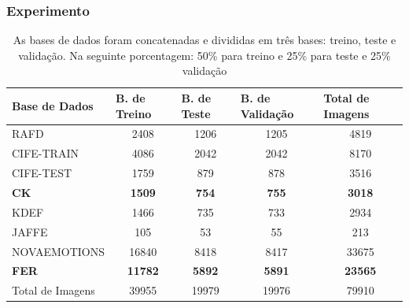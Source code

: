 \documentclass{beamer}
\begin{document}
\begin{frame}
\frametitle{Experimento}
\begin{table}
\tiny
\centering
\caption{As bases de dados foram concatenadas e divididas em três bases: treino, teste e validação. Na seguinte porcentagem: 50\% para treino e 25\% para teste e 25\% validação }
\label{table:basesdivisao}
\begin{tabular}{lcccc}
\hline
\textbf{Base de Dados} & \multicolumn{1}{l}{\textbf{B. de Treino}} & \multicolumn{1}{l}{\textbf{B. de Teste}} & \multicolumn{1}{l}{\textbf{B. de Validação}} & \multicolumn{1}{l}{\textbf{Total de Imagens}} \\ \hline
RAFD                   & 2408                                        & 1206                                       & 1205                                           & 4819                                          \\
CIFE-TRAIN             & 4086                                        & 2042                                       & 2042                                           & 8170                                          \\
CIFE-TEST              & 1759                                        & 879                                        & 878                                            & 3516                                          \\
\textbf{CK}                     & \textbf{1509}                                        & \textbf{754}                                        & \textbf{755}                                            & \textbf{3018}                                          \\
KDEF                   & 1466                                        & 735                                        & 733                                            & 2934                                          \\
JAFFE                  & 105                                         & 53                                         & 55                                             & 213                                           \\
NOVAEMOTIONS           & 16840                                       & 8418                                       & 8417                                           & 33675                                         \\
\textbf{FER}                    & \textbf{11782}                                       & \textbf{5892}                                       & \textbf{5891}                                           & \textbf{23565}                                         \\
Total de Imagens       & 39955                                       & 19979                                      & 19976                                          & 79910                                         \\ \hline
\end{tabular}
\end{table}
\end{frame}
\end{document}
